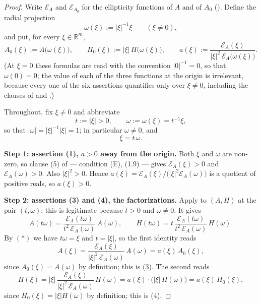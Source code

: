 \begin{proof}
Write $\mathcal E_A$ and $\mathcal E_{A_0}$ for the ellipticity functions of $A$ and of
$A_0$ (). Define the radial projection
\[
 \omega(\xi):=|\xi|^{-1}\xi\qquad(\xi\ne0),
\]
and put, for every $\xi\in\mathbb R^{m}$,
\[
 A_0(\xi):=A\big(\omega(\xi)\big),\qquad
 H_0(\xi):=|\xi|\,H\big(\omega(\xi)\big),\qquad
 a(\xi):=\frac{\mathcal E_A(\xi)}{|\xi|^{2}\,\mathcal E_A\big(\omega(\xi)\big)} .
\]
(At $\xi=0$ these formulas are read with the convention $|0|^{-1}=0$, so that
$\omega(0)=0$; the value of each of the three functions at the origin is irrelevant,
because every one of the six assertions quantifies only over $\xi\ne0$, including the
clauses of  and .)

Throughout, fix $\xi\ne0$ and abbreviate
\[
 t:=|\xi|>0,\qquad \omega:=\omega(\xi)=t^{-1}\xi,
\]
so that $|\omega|=|\xi|^{-1}|\xi|=1$; in particular $\omega\ne0$, and
\[
 \xi=t\,\omega. \tag{$\ast$}
\]

\medskip\noindent\textbf{Step 1: assertion (1), $a>0$ away from the origin.} Both $\xi$ and
$\omega$ are non-zero, so clause (5) of  --- condition (E), (1.9) --- gives
$\mathcal E_A(\xi)>0$ and $\mathcal E_A(\omega)>0$. Also $|\xi|^{2}>0$. Hence
$a(\xi)=\mathcal E_A(\xi)/\big(|\xi|^{2}\mathcal E_A(\omega)\big)$ is a quotient of positive
reals, so $a(\xi)>0$.

\medskip\noindent\textbf{Step 2: assertions (3) and (4), the factorizations.} Apply
 to $(A,H)$ at the pair $(t,\omega)$; this is legitimate
because $t>0$ and $\omega\ne0$. It gives
\[
 A(t\omega)=\frac{\mathcal E_A(t\omega)}{t^{2}\,\mathcal E_A(\omega)}\,A(\omega),
 \qquad
 H(t\omega)=t\,\frac{\mathcal E_A(t\omega)}{t^{2}\,\mathcal E_A(\omega)}\,H(\omega).
\]
By $(\ast)$ we have $t\omega=\xi$ and $t=|\xi|$, so the first identity reads
\[
 A(\xi)=\frac{\mathcal E_A(\xi)}{|\xi|^{2}\,\mathcal E_A(\omega)}\,A(\omega)
      =a(\xi)\,A_0(\xi),
\]
since $A_0(\xi)=A(\omega)$ by definition; this is (3). The second reads
\[
 H(\xi)=|\xi|\,\frac{\mathcal E_A(\xi)}{|\xi|^{2}\,\mathcal E_A(\omega)}\,H(\omega)
      =a(\xi)\cdot\Big(|\xi|\,H(\omega)\Big)
      =a(\xi)\,H_0(\xi),
\]
since $H_0(\xi)=|\xi|H(\omega)$ by definition; this is (4).


\end{proof}
